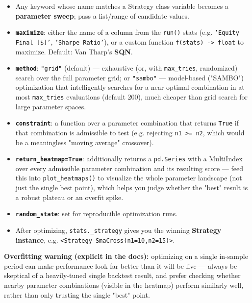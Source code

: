 \documentclass[12pt,openany]{book}
\theoremstyle{definition}
\theoremstyle{remark}
\begin{document}
\begin{itemize}
\item 
Any keyword whose name matches a Strategy class variable becomes a \textbf{parameter sweep}; pass a list/range of candidate values.

\item 
\textbf{\texttt{maximize}}: either the name of a column from the \texttt{run()} stats (e.g. \texttt{'Equity Final [\$]'}, \texttt{'Sharpe Ratio'}), or a custom function \texttt{f(stats) -> float} to maximize. Default: Van Tharp's \textbf{SQN}.

\item 
\textbf{\texttt{method}}: \texttt{"grid"} (default) — exhaustive (or, with \texttt{max\_tries}, randomized) search over the full parameter grid; or \texttt{"sambo"} — model-based ("SAMBO") optimization that intelligently searches for a near-optimal combination in at most \texttt{max\_tries} evaluations (default 200), much cheaper than grid search for large parameter spaces.

\item 
\textbf{\texttt{constraint}}: a function over a parameter combination that returns \texttt{True} if that combination is admissible to test (e.g. rejecting \texttt{n1 >= n2}, which would be a meaningless "moving average" crossover).

\item 
\textbf{\texttt{return\_heatmap=True}}: additionally returns a \texttt{pd.Series} with a MultiIndex over every admissible parameter combination and its resulting score — feed this into \texttt{plot\_heatmaps()} to visualize the whole parameter landscape (not just the single best point), which helps you judge whether the "best" result is a robust plateau or an overfit spike.

\item 
\textbf{\texttt{random\_state}}: set for reproducible optimization runs.

\item 
After optimizing, \texttt{stats.\_strategy} gives you the winning \textbf{Strategy instance}, e.g. \texttt{<Strategy SmaCross(n1=10,n2=15)>}.

\end{itemize}

\textbf{Overfitting warning (explicit in the docs):} optimizing on a single in-sample period can make performance look far better than it will be live — always be skeptical of a heavily-tuned single backtest result, and prefer checking whether nearby parameter combinations (visible in the heatmap) perform similarly well, rather than only trusting the single "best" point.
\end{document}
